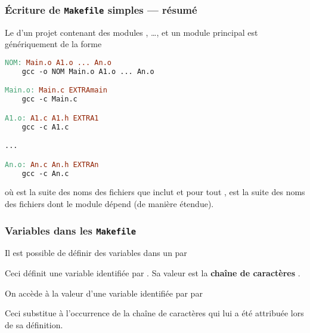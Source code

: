 \begin{frame}[fragile]
\frametitle{Écriture de {\tt Makefile} simples --- résumé}
Le  d'un projet contenant des modules , \dots,
 et un module principal  est génériquement de la
forme
\begin{lstlisting}[language=make]
NOM: Main.o A1.o ... An.o
    gcc -o NOM Main.o A1.o ... An.o

Main.o: Main.c EXTRAmain
    gcc -c Main.c

A1.o: A1.c A1.h EXTRA1
    gcc -c A1.c

...

An.o: An.c An.h EXTRAn
    gcc -c An.c
\end{lstlisting}
où  est la suite des noms des fichiers  que
 inclut et pour tout , 
est la suite des noms des fichiers  dont le module 
dépend (de manière étendue).
\end{frame}

\begin{frame}[fragile]
\frametitle{Variables dans les {\tt Makefile}}
Il est possible de \alert{définir des variables} dans un 
par
\begin{center}\end{center}
Ceci définit une variable identifiée par . Sa valeur est
la {\bf chaîne de caractères} .
\bigskip

On accède à la valeur d'une variable identifiée par  par
\begin{center}\end{center}
Ceci substitue à l'occurrence de  la chaîne de caractères qui
lui a été attribuée lors de sa définition.
\end{frame}


